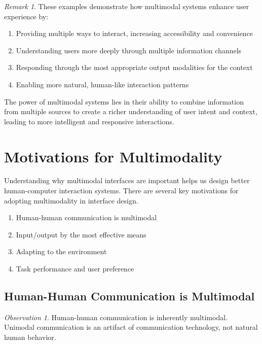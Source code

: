 \documentclass[11pt,a4paper]{article}
\theoremstyle{definition}
\theoremstyle{plain}
\theoremstyle{remark}
\newtheorem*{remark}{Remark}
\newtheorem*{observation}{Observation}
\begin{document}
\begin{remark}
These examples demonstrate how multimodal systems enhance user experience by:
\begin{enumerate}
    \item Providing multiple ways to interact, increasing accessibility and convenience
    \item Understanding users more deeply through multiple information channels
    \item Responding through the most appropriate output modalities for the context
    \item Enabling more natural, human-like interaction patterns
\end{enumerate}

The power of multimodal systems lies in their ability to combine information from multiple sources to create a richer understanding of user intent and context, leading to more intelligent and responsive interactions.
\end{remark}

\section{Motivations for Multimodality}

Understanding why multimodal interfaces are important helps us design better human-computer interaction systems. There are several key motivations for adopting multimodality in interface design.

\begin{tcolorbox}[colback=red!5!white,colframe=red!75!black,title=\textbf{Four Key Motivations}]
\begin{enumerate}
    \item Human-human communication is multimodal
    \item Input/output by the most effective means
    \item Adapting to the environment
    \item Task performance and user preference
\end{enumerate}
\end{tcolorbox}

\subsection{Human-Human Communication is Multimodal}

\begin{observation}
Human-human communication is inherently multimodal. Unimodal communication is an artifact of communication technology, not natural human behavior.
\end{observation}
\end{document}

